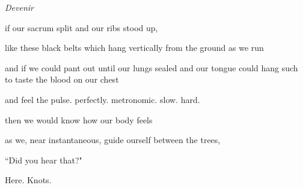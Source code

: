 \documentclass[11pt]{article}
\begin{document}
\begingroup
\begin{center}
\huge \textit{Devenir}
\end{center}
\endgroup

\vspace*{2\baselineskip}

\begingroup
\begin{center}
if our sacrum split and our ribs stood up,
\rightskip\leftskip
\end{center}
\endgroup

\begingroup
\begin{center}
like these black belts which hang vertically from the ground as we run
\rightskip\leftskip
\end{center}
\endgroup

\begingroup
\begin{center}
and if we could pant out until our lungs sealed and our tongue could hang such to taste the blood on our chest
\rightskip\leftskip
\end{center}
\endgroup

\begingroup
\begin{center}
and feel the pulse. perfectly. metronomic. slow. hard.
\rightskip\leftskip
\end{center}
\endgroup

\begingroup
\begin{center}
then we would know how our body feels
\rightskip\leftskip
\end{center}
\endgroup

\begingroup
\begin{center}
as we, near instantaneous, guide ourself between the trees,
\rightskip\leftskip
\end{center}
\endgroup

\vspace*{2\baselineskip}

\begingroup
\begin{center}
``Did you hear that?"
\end{center}
\endgroup

\vspace*{4\baselineskip}

\begingroup
\begin{center}
Here. Knots.
\rightskip\leftskip
\end{center}
\endgroup

\vspace*{4\baselineskip}
\end{document}
